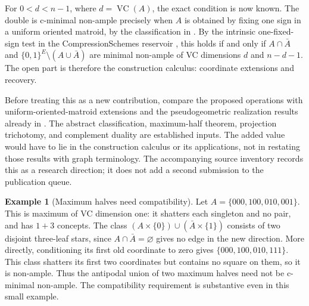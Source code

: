 \documentclass[11pt]{article}
\theoremstyle{definition}
\newtheorem{example}[proposition]{Example}
\newcommand{\bits}{\{0,1\}}
\newcommand{\VC}{\operatorname{VC}}
\begin{document}
For $0<d<n-1$, where $d=\VC(A)$, the exact condition is now known.
The double is c-minimal non-ample precisely when $A$ is obtained by fixing
one sign in a uniform oriented matroid, by the classification in \cite{MNA}.
By the intrinsic one-fixed-sign test in the CompressionSchemes reservoir
\cite[Corollary \textnormal{Intrinsic test for a one-fixed-sign parent}]{Partition},
this holds if and only if $A\cap\bar A$ and $\bits^E\setminus(A\cup\bar A)$
are minimal non-ample of VC dimensions $d$ and $n-d-1$. The open part is
therefore the construction calculus: coordinate extensions and recovery.

Before treating this as a new contribution, compare the proposed operations
with uniform-oriented-matroid extensions and the pseudogeometric realization
results already in \cite{MNA}. The abstract classification, maximum-half
theorem, projection trichotomy, and complement duality are established
inputs. The added value would have to lie in the construction calculus or
its applications, not in restating those results with graph terminology.
The accompanying source inventory records this as a research direction;
it does not add a second submission to the publication queue.

\begin{example}[Maximum halves need compatibility]\label{ex:maximum-halves}
Let $A=\{000,100,010,001\}$. This is maximum of VC dimension one:
it shatters each singleton and no pair, and has $1+3$ concepts.
The class $(A\times\{0\})\cup(\bar A\times\{1\})$ consists of two
disjoint three-leaf stars, since $A\cap\bar A=\varnothing$ gives no edge
in the new direction. More directly, conditioning its first old coordinate
to zero gives $\{000,100,010,111\}$. This class shatters its first two
coordinates but contains no square on them, so it is non-ample.
Thus the antipodal union of two maximum halves need not be c-minimal
non-ample. The compatibility requirement is substantive even in this
small example.
\end{example}
\end{document}
